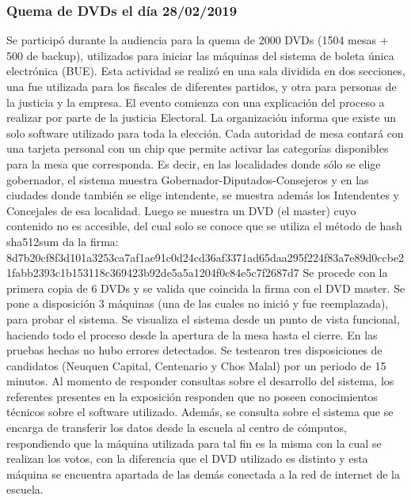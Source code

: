 \subsubsection{Quema de DVDs el día 28/02/2019}
Se participó durante la audiencia para la quema de 2000 DVDs (1504 mesas + 500 de backup), utilizados para iniciar las máquinas del sistema de boleta única electrónica (BUE). \newline
Esta actividad se realizó en una sala dividida en dos secciones, una fue utilizada para los fiscales de diferentes partidos, y otra para personas de la justicia y la empresa.  \newline
El evento comienza con una explicación del proceso a realizar por parte de la justicia Electoral.  La organización informa que existe un solo software utilizado para toda la elección. Cada autoridad de mesa contará con una tarjeta personal con un chip que permite activar las categorías disponibles para la mesa que corresponda. Es decir, en las localidades donde sólo se elige gobernador, el sistema muestra Gobernador-Diputados-Consejeros y en las ciudades donde también se elige intendente, se muestra además los Intendentes y Concejales de esa localidad. \newline
Luego se muestra un DVD (el master) cuyo contenido no es accesible, del cual solo se conoce que se utiliza el método de hash sha512sum da la firma: \newline
8d7b20cf8f3d101a3253ca7af1ae91c0d24cd36af3371ad65daa295f224f83a7e89d0ccbe21fabb2393c1b153118c369423b92de5a5a1204f0c84e5c7f2687d7  \newline
Se procede con la primera copia de 6 DVDs y se valida que coincida la firma con el DVD master.  
Se pone a disposición 3 máquinas (una de las cuales no inició y fue reemplazada), para probar el sistema. Se visualiza el sistema desde un punto de vista funcional, haciendo todo el proceso desde la apertura de la mesa hasta el cierre. En las pruebas hechas no hubo errores detectados. Se testearon tres disposiciones de candidatos (Neuquen Capital, Centenario y Chos Malal) por un periodo de 15 minutos. 
Al momento de responder consultas sobre el desarrollo del sistema, los referentes presentes en la exposición responden que no poseen conocimientos técnicos sobre el software utilizado. Además, se consulta sobre el sistema que se encarga de transferir los datos desde la escuela al centro de cómputos, respondiendo que la máquina utilizada para tal fin es la misma con la cual se realizan los votos, con la diferencia que el DVD utilizado es distinto y esta máquina se encuentra apartada de las demás conectada a la red de internet de la escuela. \newline
